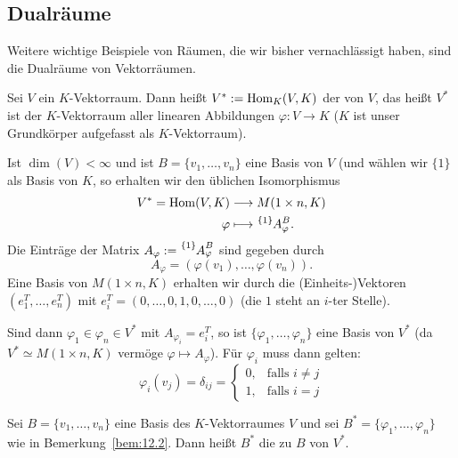 \subsection{Dualräume}
\label{sec:2.12}
	Weitere wichtige Beispiele von Räumen, die wir bisher vernachlässigt haben, sind die Dualräume von Vektorräumen.
	
\begin{definition}[Dualraum]
	\label{def:12.1}
	Sei $V$ ein $K$-Vektorraum.
	Dann heißt $V^* := \operatorname{Hom}_K(V,K)$ der  von $V$, das heißt $V^*$ ist der $K$-Vektorraum aller linearen Abbildungen $\varphi\colon V \rightarrow K$ ($K$ ist unser Grundkörper aufgefasst als $K$-Vektorraum).
\end{definition}

\begin{bemerkung}
	\label{bem:12.2}
	Ist $\dim(V) < \infty$ und ist $B = \{v_1,\dots,v_n\}$ eine Basis von $V$ (und wählen wir $\{1\}$ als Basis von $K$, so erhalten wir den üblichen Isomorphismus
	\begin{align*}
		V^* = \Hom(V,K) &\longrightarrow M(1 \times n, K) \\
		\varphi &\longmapsto \mat{A}{\{1\}}{B}{\varphi}.
	\end{align*}
	Die Einträge der Matrix $A_\varphi := \mat{A}{\{1\}}{B}{\varphi}$ sind gegeben durch
	\[
		A_\varphi = (\varphi(v_1),\dots,\varphi(v_n)).
	\]
	Eine Basis von $M(1\times n,K)$ erhalten wir durch die (Einheits-)Vektoren $(e_1^T,\dots,e_n^T)$ mit $e_i^T = (0,\dots,0,1,0,\dots,0)$ (die $1$ steht an $i$-ter Stelle).
	
	Sind dann $\varphi_1 \in \varphi_n \in V^*$ mit $A_{\varphi_i} = e_i^T$, so ist $\{\varphi_1,\dots,\varphi_n\}$ eine Basis von $V^*$ (da $V^* \simeq M(1 \times n,K)$ vermöge $\varphi \mapsto A_\varphi$).
	Für $\varphi_i$ muss dann gelten:
	\[
		\varphi_i(v_j) = \delta_{ij} = \begin{cases}
			0, & \text{falls } i \neq j \\
			1, & \text{falls } i = j
		\end{cases}
	\]
\end{bemerkung}

\begin{definition}
	\label{def:12.3}
	Sei $B = \{v_1,\dots,v_n\}$ eine Basis des $K$-Vektorraumes $V$ und sei $B^* = \{\varphi_1,\dots,\varphi_n\}$ wie in Bemerkung~\ref{bem:12.2}.
	Dann heißt $B^*$ die zu $B$  von $V^*$.
\end{definition}

